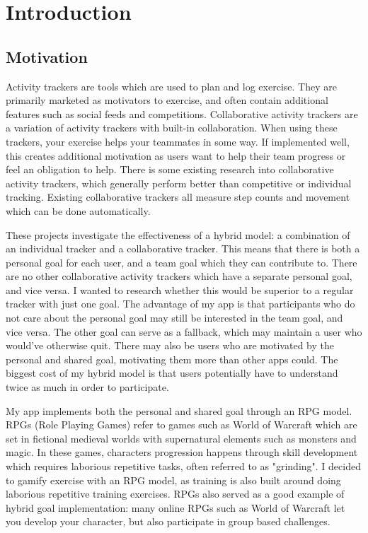 \documentclass{l4proj}
\begin{document}
\chapter{Introduction}

\section{Motivation}

Activity trackers are tools which are used to plan and log exercise. They are primarily marketed as motivators to exercise, and often contain additional features such as social feeds and competitions. Collaborative activity trackers are a variation of activity trackers with built-in collaboration. When using these trackers, your exercise helps your teammates in some way. If implemented well, this creates additional motivation as users want to help their team progress or feel an obligation to help. There is some existing research into collaborative activity trackers, which generally perform better than competitive or individual tracking. Existing collaborative trackers all measure step counts and movement which can be done automatically. 

These projects investigate the effectiveness of a hybrid model: a combination of an individual tracker and a collaborative tracker. This means that there is both a personal goal for each user, and a team goal which they can contribute to. There are no other collaborative activity trackers which have a separate personal goal, and vice versa. I wanted to research whether this would be superior to a regular tracker with just one goal. The advantage of my app is that participants who do not care about the personal goal may still be interested in the team goal, and vice versa. The other goal can serve as a fallback, which may maintain a user who would've otherwise quit. There may also be users who are motivated by the personal and shared goal, motivating them more than other apps could. The biggest cost of my hybrid model is that users potentially have to understand twice as much in order to participate. 

My app implements both the personal and shared goal through an RPG model. RPGs (Role Playing Games) refer to games such as World of Warcraft which are set in fictional medieval worlds with supernatural elements such as monsters and magic. In these games, characters progression happens through skill development which requires laborious repetitive tasks, often referred to as "grinding". I decided to gamify exercise with an RPG model, as training is also built around doing laborious repetitive training exercises. RPGs also served as a good example of hybrid goal implementation: many online RPGs such as World of Warcraft let you develop your character, but also participate in group based challenges.
\end{document}
